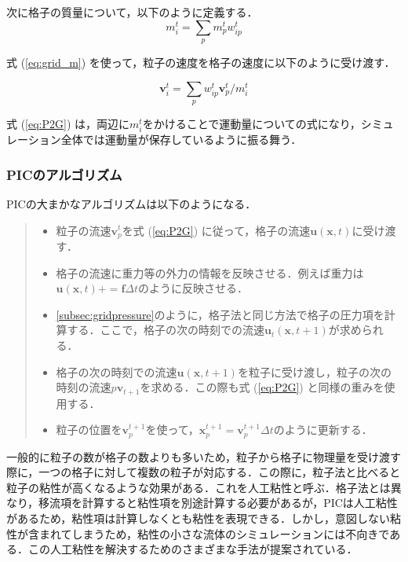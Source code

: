 \documentclass[a4j,12pt]{jreport}
\begin{document}
次に格子の質量について，以下のように定義する．
\begin{equation}\label{eq:grid_m}
m^t_i = \sum\limits_p m^t_pw^t_{ip}
\end{equation} 

式 (\ref{eq:grid_m}) を使って，粒子の速度を格子の速度に以下のように受け渡す．

\begin{equation}\label{eq:P2G}
\bm{v}^t_i = \sum\limits_p w^t_{ip}\bm{v}^t_p / m^t_i
\end{equation} 

式 (\ref{eq:P2G}) は，両辺に$m^t_i$をかけることで運動量についての式になり，シミュレーション全体では運動量が保存しているように振る舞う．

\subsubsection{PICのアルゴリズム} \label{subsec:PIC_algo}
PICの大まかなアルゴリズムは以下のようになる．
\begin{quote}
	\begin{itemize}
		\item 粒子の流速$\bm{v}^{t}_p$を式 (\ref{eq:P2G}) に従って，格子の流速$\bm{u} (\bm{x},t) $に受け渡す．
		\item 格子の流速に重力等の外力の情報を反映させる．例えば重力は$\bm{u} (\bm{x},t)  += \bm{f}\varDelta t$のように反映させる．
		\item \ref{subsec:gridpressure}のように，格子法と同じ方法で格子の圧力項を計算する．ここで，格子の次の時刻での流速$\bm{u}_t (\bm{x},t+1) $が求められる．
		\item 格子の次の時刻での流速$\bm{u} (\bm{x},t+1) $を粒子に受け渡し，粒子の次の時刻の流速$p\bm{v}_{t+1}$を求める．この際も式 (\ref{eq:P2G}) と同様の重みを使用する．
		\item 粒子の位置を$\bm{v}^{t+1}_p$を使って，$\bm{x}^{t+1}_p = \bm{v}^{t+1}_p\varDelta t $のように更新する．
	\end{itemize}
\end{quote}

一般的に粒子の数が格子の数よりも多いため，粒子から格子に物理量を受け渡す際に，一つの格子に対して複数の粒子が対応する．この際に，粒子法と比べると粒子の粘性が高くなるような効果がある．これを人工粘性と呼ぶ．格子法とは異なり，移流項を計算すると粘性項を別途計算する必要があるが，PICは人工粘性があるため，粘性項は計算しなくとも粘性を表現できる．しかし，意図しない粘性が含まれてしまうため，粘性の小さな流体のシミュレーションには不向きである．この人工粘性を解決するためのさまざまな手法が提案されている．
\end{document}
